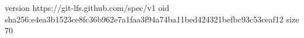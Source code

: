version https://git-lfs.github.com/spec/v1
oid sha256:e4ea3b1523ce8fc36b962e7a1faa3f94a74ba11bed424321befbc93c53ceaf12
size 70
